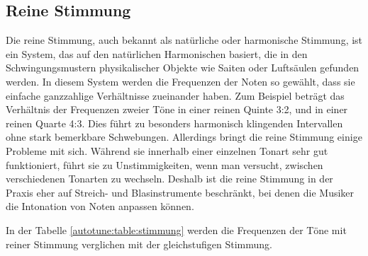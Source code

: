 \subsection{Reine Stimmung
\label{autotune:subsection:reineStimmung}}
Die reine Stimmung, auch bekannt als natürliche oder harmonische Stimmung, ist ein System,
das auf den natürlichen Harmonischen basiert, die in den Schwingungsmustern physikalischer Objekte wie Saiten oder Luftsäulen gefunden werden.
In diesem System werden die Frequenzen der Noten so gewählt, dass sie einfache ganzzahlige Verhältnisse zueinander haben.
Zum Beispiel beträgt das Verhältnis der Frequenzen zweier Töne in einer reinen Quinte 3:2, und in einer reinen Quarte 4:3.
Dies führt zu besonders harmonisch klingenden Intervallen ohne stark bemerkbare Schwebungen.
Allerdings bringt die reine Stimmung einige Probleme mit sich.
Während sie innerhalb einer einzelnen Tonart sehr gut funktioniert, führt sie zu Unstimmigkeiten,
wenn man versucht, zwischen verschiedenen Tonarten zu wechseln.
Deshalb ist die reine Stimmung in der Praxis eher auf Streich- und Blasinstrumente beschränkt,
bei denen die Musiker die Intonation von Noten anpassen können.

In der Tabelle \ref{autotune:table:stimmung} werden die Frequenzen der Töne mit reiner Stimmung verglichen mit der gleichstufigen Stimmung.

